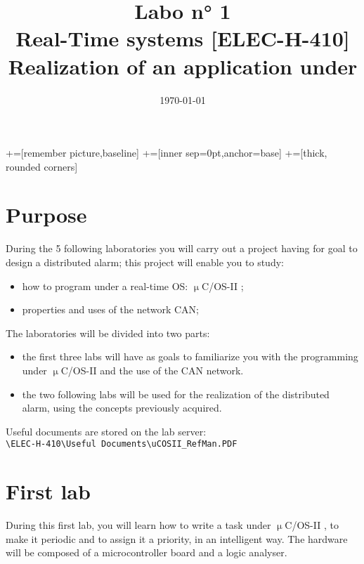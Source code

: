 \documentclass[10pt,a4paper]{article}
\date{\vspace{-1cm}\mydate\today}
\title{\vspace{-2cm} Labo n° 1\\ Real-Time systems [ELEC-H-410]\\ Realization of an application under \uCOSII \ifthenelse{\boolean{corrige}}{~\\Corrigé}{}}
\theoremstyle{definition}%
\newcommand{\uCOSII}{$\upmu$C/OS-II }
\begin{document}
\newcommand\tabnode[1]{\addtocounter{nodecount}{1} \tikz \node (\arabic{nodecount}) {#1};}

+=[remember picture,baseline]
+=[inner sep=0pt,anchor=base]
+=[thick, rounded corners]



\maketitle
\section*{Purpose}
During the 5 following laboratories you will carry out a project having for goal to design a distributed
alarm; this project will enable you to study:
\begin{itemize}
\item how to program under a real-time OS: \uCOSII;
\item properties and uses of the network CAN;
\end{itemize}

The laboratories will be divided into two parts:
\begin{itemize}
\item the first three labs will have as goals to familiarize you with the programming under \uCOSII and
the use of the CAN network.
\item  the two following labs will be used for the realization of the distributed alarm, using the concepts
previously acquired.
\end{itemize}
 
\noindent
Useful documents are stored on the lab server:\\
 \verb!\ELEC-H-410\Useful Documents\uCOSII_RefMan.PDF!

\section{First lab}
During this first lab, you will learn how to write a task under \uCOSII, to make it periodic and to assign
it a priority, in an intelligent way. The hardware will be composed of a microcontroller board and a logic
analyser.
\end{document}
